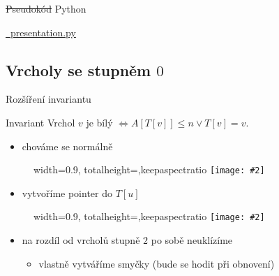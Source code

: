 \documentclass[czech]{beamer}
\makeatletter
\newcommand{\fitimage}[2][\@nil]{
	\begin{figure}
		\begin{adjustbox}{width=0.9\textwidth, totalheight=\textheight-2\baselineskip-2\baselineskip,keepaspectratio}
			\texttt{[image: \#2]}
		\end{adjustbox}
		\def\tmp{#1}%
	 \ifx\tmp\@nnil
			\else
			\caption{#1}
		\fi
	\end{figure}
}
\makeatother
\begin{document}
	\begin{frame}{\st{Pseudokód} Python}
		\begin{center}
			\href{run:presentation.py}{\faPython\ presentation.py} 
		\end{center}
	\end{frame}

	\subsection{Vrcholy se stupněm $0$}

	\begin{frame}{Rozšíření invariantu}
		\begin{block}{Invariant}
			Vrchol $v$ je bílý $\iff A[T[v]] \le n \lor T\left[v\right] = v$.
		\end{block}
		\begin{minipage}[t]{0.5\textwidth}
				\vspace{0pt}
				\begin{itemize}
					\item chováme se normálně
				\end{itemize}
				\fitimage{images/deg0-2.png}
		\end{minipage}%
		\hfill
		\begin{minipage}[t]{0.5\textwidth}
			\vspace{0pt}
			\begin{itemize}
				\item vytvoříme pointer do $T[u]$
			\end{itemize}
			\fitimage{images/deg0-1.png}
		\end{minipage}
		\vfill
		\begin{itemize}
			\item na rozdíl od vrcholů stupně $2$ po sobě neuklízíme
			\begin{itemize}
				\item vlastně vytváříme smyčky (bude se hodit při obnovení)
			\end{itemize}
		\end{itemize}
	\end{frame}
\end{document}
